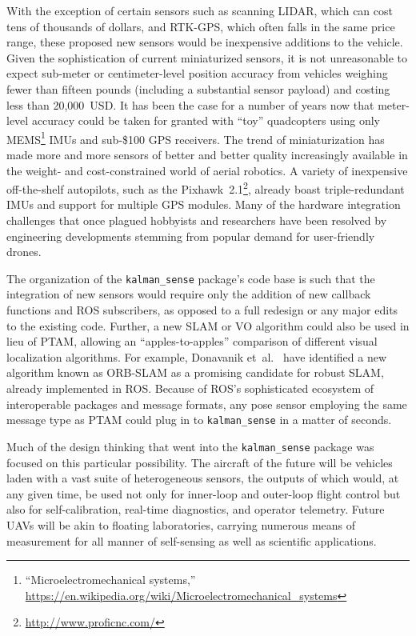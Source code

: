 With the exception of certain sensors such as scanning LIDAR, which can cost tens of thousands of dollars, and RTK-GPS, which often falls in the same price range, these proposed new sensors would be inexpensive additions to the vehicle. Given the sophistication of current miniaturized sensors, it is not unreasonable to expect sub-meter or centimeter-level position accuracy from vehicles weighing fewer than fifteen pounds (including a substantial sensor payload) and costing less than 20,000~USD. It has been the case for a number of years now that meter-level accuracy could be taken for granted with ``toy'' quadcopters using only MEMS\footnote{``Microelectromechanical systems,'' \url{https://en.wikipedia.org/wiki/Microelectromechanical_systems}} IMUs and sub-\$100 GPS receivers. The trend of miniaturization has made more and more sensors of better and better quality increasingly available in the weight- and cost-constrained world of aerial robotics. A variety of inexpensive off-the-shelf autopilots, such as the Pixhawk~2.1\footnote{\url{http://www.proficnc.com/}}, already boast triple-redundant IMUs and support for multiple GPS modules. Many of the hardware integration challenges that once plagued hobbyists and researchers have been resolved by engineering developments stemming from popular demand for user-friendly drones.

The organization of the \texttt{kalman\_sense} package's code base is such that the integration of new sensors would require only the addition of new callback functions and ROS subscribers, as opposed to a full redesign or any major edits to the existing code. Further, a new SLAM or VO algorithm could also be used in lieu of PTAM, allowing an ``apples-to-apples'' comparison of different visual localization algorithms. For example, Donavanik et~al.\ \cite{Donavanik2016} have identified a new algorithm known as ORB-SLAM \cite{Mur-Artal2015} as a promising candidate for robust SLAM, already implemented in ROS. Because of ROS's sophisticated ecosystem of interoperable packages and message formats, any pose sensor employing the same message type as PTAM could plug in to \texttt{kalman\_sense} in a matter of seconds.

Much of the design thinking that went into the \texttt{kalman\_sense} package was focused on this particular possibility. The aircraft of the future will be vehicles laden with a vast suite of heterogeneous sensors, the outputs of which would, at any given time, be used not only for inner-loop and outer-loop flight control but also for self-calibration, real-time diagnostics, and operator telemetry. Future UAVs will be akin to floating laboratories, carrying numerous means of measurement for all manner of self-sensing as well as scientific applications.

